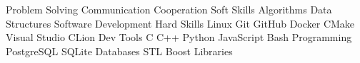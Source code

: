 
\begin{cventries}
    \cventryii
        {Problem Solving \cvseparator Communication \cvseparator Cooperation}
        {Soft Skills}
    \cventryii
        {Algorithms \cvseparator Data Structures \cvseparator Software Development}
        {Hard Skills}
    \cventryii
        {Linux \cvseparator Git \cvseparator GitHub \cvseparator Docker \cvseparator CMake \cvseparator Visual Studio \cvseparator CLion}
        {Dev Tools}
    \cventryii
        {C \cvseparator C++ \cvseparator Python \cvseparator JavaScript \cvseparator Bash}
        {Programming}
    \cventryii
        {PostgreSQL \cvseparator SQLite}
        {Databases}
    \cventryii
        {STL \cvseparator Boost}
        {Libraries}
\end{cventries}
